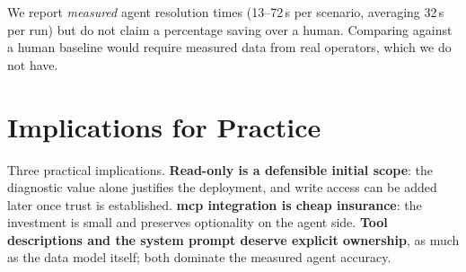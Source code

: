 We report \emph{measured} agent resolution times (13--72\,s per scenario, averaging 32\,s per run) but do not claim a percentage saving over a human. Comparing against a human baseline would require measured data from real operators, which we do not have.

\section{Implications for Practice}

Three practical implications. \textbf{Read-only is a defensible initial scope}: the diagnostic value alone justifies the deployment, and write access can be added later once trust is established. \textbf{\gls{mcp} integration is cheap insurance}: the investment is small and preserves optionality on the agent side. \textbf{Tool descriptions and the system prompt deserve explicit ownership}, as much as the data model itself; both dominate the measured agent accuracy.
